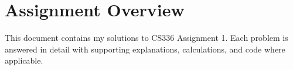 \section{Assignment Overview}

This document contains my solutions to CS336 Assignment 1. Each problem is answered in detail with supporting explanations, calculations, and code where applicable.